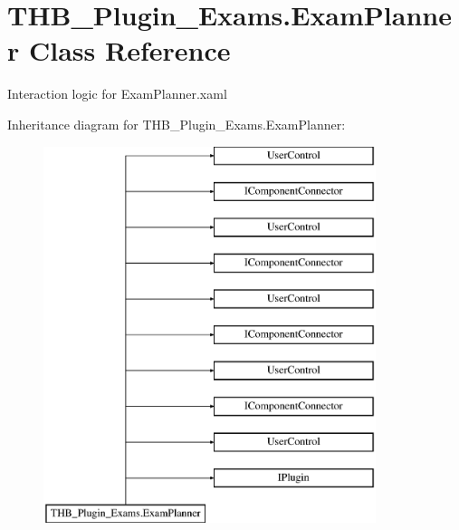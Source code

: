 \hypertarget{class_t_h_b___plugin___exams_1_1_exam_planner}{}\section{T\+H\+B\+\_\+\+Plugin\+\_\+\+Exams.\+Exam\+Planner Class Reference}
\label{class_t_h_b___plugin___exams_1_1_exam_planner}


Interaction logic for Exam\+Planner.\+xaml  


Inheritance diagram for T\+H\+B\+\_\+\+Plugin\+\_\+\+Exams.\+Exam\+Planner\+:\begin{figure}[H]
\begin{center}
\leavevmode
\includegraphics[height=11.000000cm]{df/df8/class_t_h_b___plugin___exams_1_1_exam_planner}
\end{center}
\end{figure}
